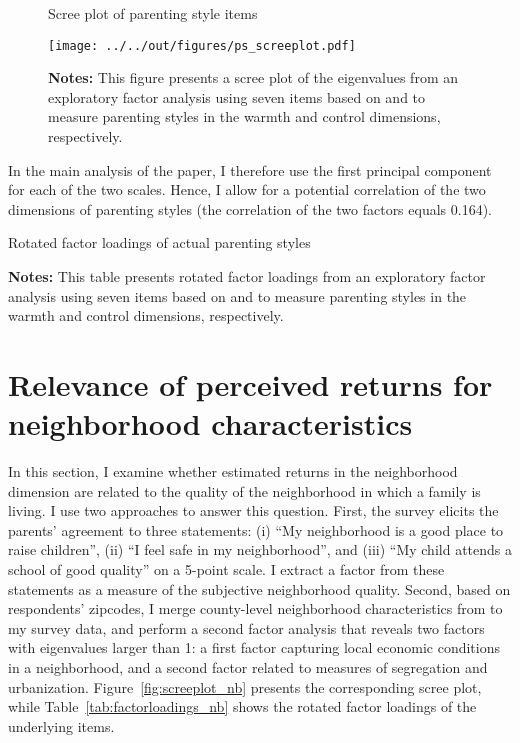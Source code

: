 \documentclass[12pt, a4paper, english]{article}
\begin{document}
\begin{figure}[h!]\centering
    \caption{Scree plot of parenting style items}\label{fig:screeplot}
    \texttt{[image: ../../out/figures/ps\_screeplot.pdf]} 
    \caption*{\footnotesize \textbf{Notes:} This figure presents a scree plot of the eigenvalues from an exploratory factor analysis using seven items based on \citet{Perrisetal1980} and \citet{Schwarzetal1997} to measure parenting styles in the warmth and control dimensions, respectively.}
\end{figure}

In the main analysis of the paper, I therefore use the first principal component for each of the two scales. Hence, I allow for a potential correlation of the two dimensions of parenting styles (the correlation of the two factors equals 0.164). 

\begin{table}[h!]
    \caption{Rotated factor loadings of actual parenting styles}\label{tab:factorloadings}
    \centering
        
    \vspace{0.5em}
    \caption*{\footnotesize \textbf{Notes:} This table presents rotated factor loadings from an exploratory factor analysis using seven items based on \citet{Perrisetal1980} and \citet{Schwarzetal1997} to measure parenting styles in the warmth and control dimensions, respectively.}
\end{table}


\clearpage
\section{Relevance of perceived returns for neighborhood characteristics}\label{app:predictivepower}
\setcounter{table}{0}
\setcounter{figure}{0}
\setcounter{footnote}{0}

In this section, I examine whether estimated returns in the neighborhood dimension are related to the quality of the neighborhood in which a family is living. I use two approaches to answer this question. First, the survey elicits the parents' agreement to three statements: (i) ``My neighborhood is a good place to raise children'', (ii) ``I feel safe in my neighborhood'', and (iii) ``My child attends a school of good quality'' on a 5-point scale. I extract a factor from these statements as a measure of the subjective neighborhood quality. Second, based on respondents' zipcodes, I merge county-level neighborhood characteristics from \citet{ChettyHendren2018Exposure,ChettyHendren2018County} to my survey data, and perform a second factor analysis that reveals two factors with eigenvalues larger than 1: a first factor capturing local economic conditions in a neighborhood, and a second factor related to measures of segregation and urbanization. Figure~\ref{fig:screeplot_nb} presents the corresponding scree plot, while Table~\ref{tab:factorloadings_nb} shows the rotated factor loadings of the underlying items. 
\end{document}
